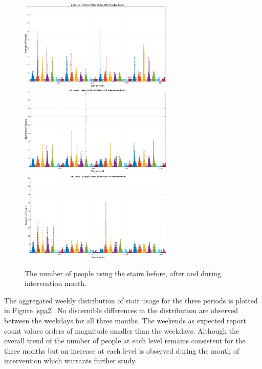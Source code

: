 \begin{figure}[!htbp]
\centering
    \includegraphics[width=0.65\textwidth]{image/Chapters/Chapter6/18-Mar-2019Base.jpg}
    \includegraphics[width=0.65\textwidth]{image/Chapters/Chapter6/29-Apr-2019Int.jpg}
    \includegraphics[width=0.65\textwidth]{image/Chapters/Chapter6/27-May-2019Follow.jpg}
    \caption{The number of people using the stairs before, after and during intervention month.}
    \label{3mon}
\end{figure}

The aggregated weekly distribution of stair usage for the three periods is plotted in Figure \ref{spa2}. No discernible differences in the distribution are observed between the weekdays for all three months. The weekends as expected report count values orders of magnitude smaller than the weekdays. Although the overall trend of the number of people at each level remains consistent for the three months but an increase at each level is observed during the month of intervention which warrants further study.


